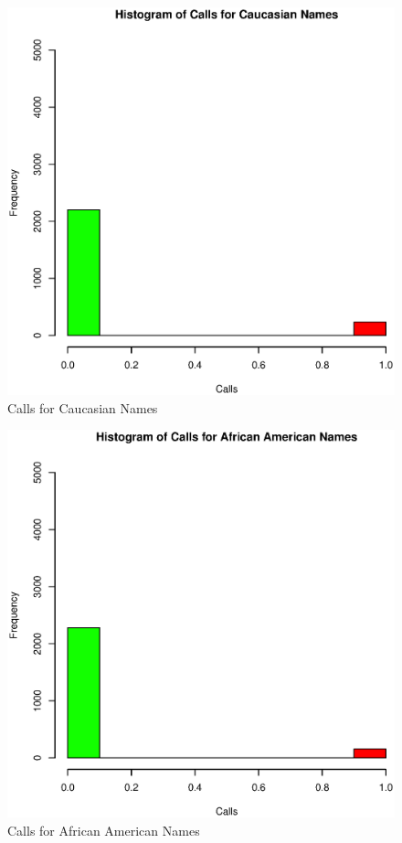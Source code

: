 \documentclass{paper}
\begin{document}
\begin{figure}
\centering
\includegraphics[width=\textwidth]{../Figures/Histogram-CallsforCaucasianNames.eps}
\caption{Calls for Caucasian Names}
\label{fig:whitecalls}
\end{figure}


\begin{figure}
\centering
\includegraphics[width=\textwidth]{../Figures/Histogram-CallsforAfricanAmericanNames.eps}
\caption{Calls for African American Names}
\label{fig:blackcalls}
\end{figure}
\end{document}
